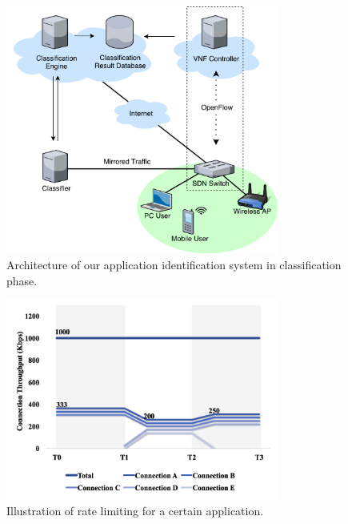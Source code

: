 \begin{figure}[!t]
\centering
\includegraphics[width=0.8\textwidth]{./fig/classification_classifying}
\caption{Architecture of our application identification system in classification phase.}
\label{fig:class_classifying}
\end{figure}

\begin{figure}[!t]
\centering
\includegraphics[width=0.8\textwidth]{./fig/mft_qos_rate_app}
\caption{Illustration of rate limiting for a certain application.}
\label{fig:mft_qos_rate_app}
\end{figure}

